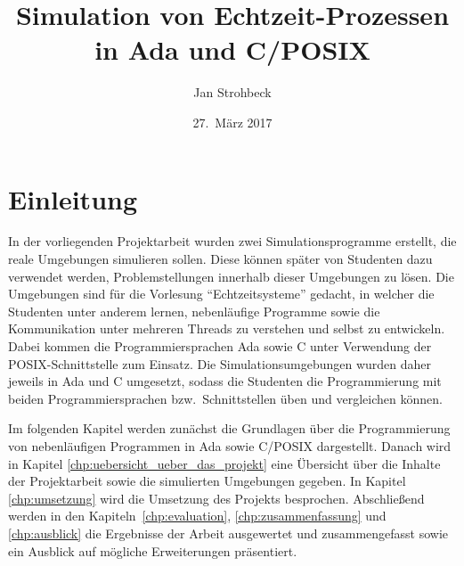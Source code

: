 \documentclass[oneside]{elaboration}
\begin{document}
\author{Jan Strohbeck}
\title{\textbf{Simulation von Echtzeit-Prozessen in Ada und C/POSIX}}
\date{27.\ März 2017}

\maketitle
\newpage


\tableofcontents
\newpage

\setcounter{page}{1}


\listoffigures
{}
\newpage

\setcounter{page}{1}

\renewcommand*{\chapterpagestyle}{scrheadings}

\chapter{Einleitung}
\label{chp:einleitung}

In der vorliegenden Projektarbeit wurden zwei Simulationsprogramme erstellt,
die reale Umgebungen simulieren sollen. Diese können später von Studenten dazu
verwendet werden, Problemstellungen innerhalb dieser Umgebungen zu lösen. Die
Umgebungen sind für die Vorlesung \enquote{Echtzeitsysteme} gedacht, in welcher
die Studenten unter anderem lernen, nebenläufige Programme sowie die
Kommunikation unter mehreren Threads zu verstehen und selbst zu entwickeln.
Dabei kommen die Programmiersprachen Ada sowie C unter Verwendung der
POSIX-Schnittstelle zum Einsatz. Die Simulationsumgebungen wurden daher jeweils in
Ada und C umgesetzt, sodass die Studenten die Programmierung mit beiden
Programmiersprachen bzw.\ Schnittstellen üben und vergleichen können.

Im folgenden Kapitel werden zunächst die Grundlagen über die Programmierung von
nebenläufigen Programmen in Ada sowie C/POSIX dargestellt. Danach wird in
Kapitel \ref{chp:uebersicht_ueber_das_projekt} eine Übersicht über die Inhalte
der Projektarbeit sowie die simulierten Umgebungen gegeben. In Kapitel
\ref{chp:umsetzung} wird die Umsetzung des Projekts besprochen. Abschließend
werden in den Kapiteln~\ref{chp:evaluation}, \ref{chp:zusammenfassung} und
\ref{chp:ausblick} die Ergebnisse der Arbeit ausgewertet und zusammengefasst
sowie ein Ausblick auf mögliche Erweiterungen präsentiert.
\end{document}
